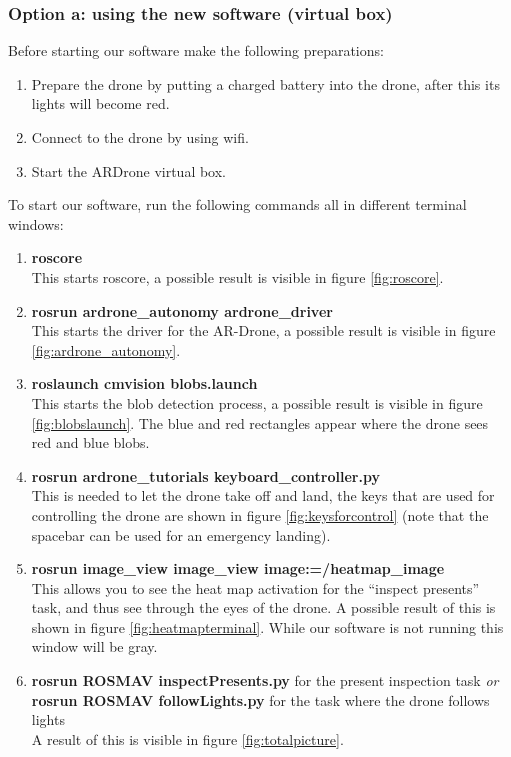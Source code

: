 \documentclass[a4paper,10pt]{article}
\begin{document}
\subsubsection{Option a: using the new software (virtual box)}
Before starting our software make the following preparations: 
\begin{enumerate}
	\item Prepare the drone by putting a charged battery into the drone, after this its lights will become red.
	\item Connect to the drone by using wifi. 
	\item Start the ARDrone virtual box.  
\end{enumerate}
To start our software, run the following commands all in different terminal windows:
\begin{enumerate}
\item \textbf{roscore} \\ This starts roscore, a possible result is visible in figure \ref{fig:roscore}.
\item \textbf{rosrun ardrone\_autonomy ardrone\_driver} \\ This starts the driver for the AR-Drone, a possible result is visible in figure \ref{fig:ardrone_autonomy}.
\item \textbf{roslaunch cmvision blobs.launch} \\ This starts the blob detection process, a possible result is visible in figure \ref{fig:blobslaunch}. The blue and red rectangles appear where the drone sees red and blue blobs. 
\item \textbf{rosrun ardrone\_tutorials keyboard\_controller.py} \\ This is needed to let the drone take off and land, the keys that are used for controlling the drone are shown in figure \ref{fig:keysforcontrol} (note that the spacebar can be used for an emergency landing).
\item \textbf{rosrun image\_view image\_view image:=/heatmap\_image} \\ This
      allows you to see the heat map activation for the ``inspect presents''
      task, and thus see through the eyes of the drone. A possible result of this is shown in figure \ref{fig:heatmapterminal}. While our software is not running this window will be gray. 
\item \textbf{rosrun ROSMAV inspectPresents.py} for the present inspection task \textit{or} \\
      \textbf{rosrun ROSMAV followLights.py} for the task where the drone follows lights\\
      A result of this is visible in figure \ref{fig:totalpicture}.
\end{enumerate}
\end{document}

